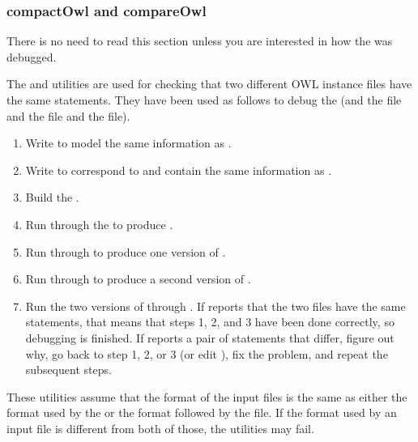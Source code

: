 \subsubsection{compactOwl and compareOwl}
There is no need to read this section unless you are interested in how the
 was debugged.

The  and  utilities are used for checking that two
different OWL instance files have the same statements. They have been
used as follows to debug the  (and the  file
and the  file and the  file).

\begin{enumerate}
\item Write  to model the same information as .

\item Write  to correspond to  and contain the
same information as .

\item Build the .

\item Run  through the  to produce
.

\item Run  through  to produce
one version of .

\item Run  through  to produce
a second version of .

\item Run the two versions of  through
. If  reports that the two files have the same
statements, that means that steps 1, 2, and 3 have been done correctly, so
debugging is finished. If  reports a pair of statements that
differ, figure out why, go back to step 1, 2, or 3 (or edit
), fix the problem, and repeat the subsequent steps.
\end{enumerate}

These utilities assume that the format of the input files is the same
as either the format used by the  or the format followed by
the  file. If the format used by an input file is
different from both of those, the utilities may fail.

